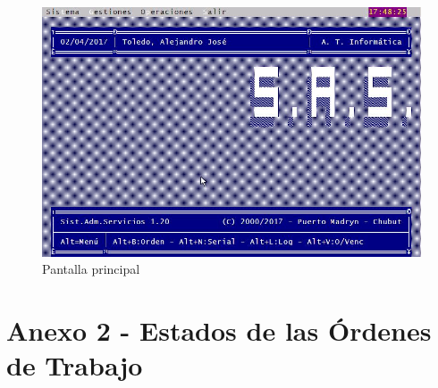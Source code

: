 \documentclass[12pt]{extarticle}
\begin{document}
    \begin{figure}[h]
    \includegraphics[scale=0.5]{images/pantalla_principal.jpg}
    \caption{Pantalla principal}
    \end{figure}

\clearpage

\section{Anexo 2 - Estados de las Órdenes de Trabajo}
\end{document}
